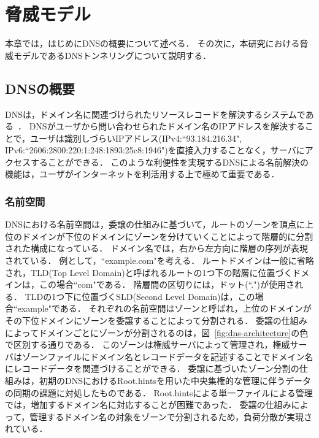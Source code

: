 \section{脅威モデル}
\label{sec:threat-model}
本章では，はじめにDNSの概要について述べる．
その次に，本研究における脅威モデルであるDNSトンネリングについて説明する．

\subsection{DNSの概要}
\label{sec:dns-protocol}

DNSは，ドメイン名に関連づけられたリソースレコードを解決するシステムである~\cite{rfc1034, rfc1035}．
DNSがユーザから問い合わせられたドメイン名のIPアドレスを解決することで，ユーザは識別しづらいIPアドレス(IPv4:``93.184.216.34", IPv6:``2606:2800:220:1:248:1893:25c8:1946")を直接入力することなく，サーバにアクセスすることができる．
このような利便性を実現するDNSによる名前解決の機能は，ユーザがインターネットを利活用する上で極めて重要である．

\subsubsection{名前空間}
DNSにおける名前空間は，委譲の仕組みに基づいて，ルートのゾーンを頂点に上位のドメインが下位のドメインにゾーンを分けていくことによって階層的に分割された構成になっている．
ドメイン名では，右から左方向に階層の序列が表現されている．
例として，``example.com"を考える．
ルートドメインは一般に省略され，TLD(Top Level Domain)と呼ばれるルートの1つ下の階層に位置づくドメインは，この場合``com"である．
階層間の区切りには，ドット(``.")が使用される．
TLDの1つ下に位置づくSLD(Second Level Domain)は，この場合``example"である．
それぞれの名前空間はゾーンと呼ばれ，上位のドメインがその下位ドメインにゾーンを委譲することによって分割される．
委譲の仕組みによってドメインごとにゾーンが分割されるのは，図~\ref{fig:dns-architecture}の色で区別する通りである．
このゾーンは権威サーバによって管理され，権威サーバはゾーンファイルにドメイン名とレコードデータを記述することでドメイン名にレコードデータを関連づけることができる．
委譲に基づいたゾーン分割の仕組みは，初期のDNSにおけるRoot.hintsを用いた中央集権的な管理に伴うデータの同期の課題に対処したものである．
Root.hintsによる単一ファイルによる管理では，増加するドメイン名に対応することが困難であった．
委譲の仕組みによって，管理するドメイン名の対象をゾーンで分割されるため，負荷分散が実現されている．

